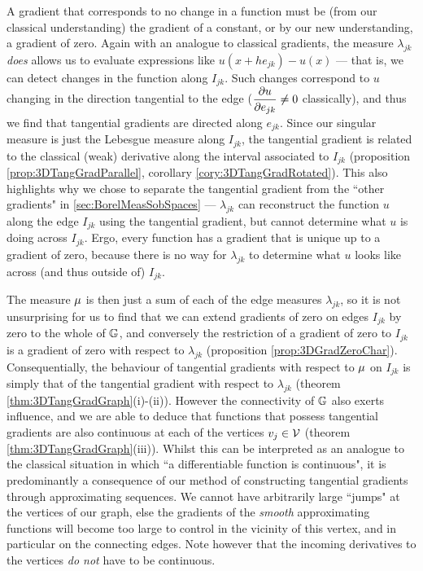 A gradient that corresponds to no change in a function must be (from our classical understanding) the gradient of a constant, or by our new understanding, a gradient of zero.
Again with an analogue to classical gradients, the measure $\lambda_{jk}$ \emph{does} allows us to evaluate expressions like $u(x+he_{jk})-u(x)$ --- that is, we can detect changes in the function along $I_{jk}$.
Such changes correspond to $u$ changing in the direction tangential to the edge ($\dfrac{\partial u}{\partial e_{jk}}\neq 0$ classically), and thus we find that tangential gradients are directed along $e_{jk}$.
Since our singular measure is just the Lebesgue measure along $I_{jk}$, the tangential gradient is related to the classical (weak) derivative along the interval associated to $I_{jk}$ (proposition \ref{prop:3DTangGradParallel}, corollary \ref{cory:3DTangGradRotated}).
This also highlights why we chose to separate the tangential gradient from the ``other gradients" in \ref{sec:BorelMeasSobSpaces} --- $\lambda_{jk}$ can reconstruct the function $u$ along the edge $I_{jk}$ using the tangential gradient, but cannot determine what $u$ is doing across $I_{jk}$.
Ergo, every function has a gradient that is unique up to a gradient of zero, because there is no way for $\lambda_{jk}$ to determine what $u$ looks like across (and thus outside of) $I_{jk}$.

The measure $\mu$ is then just a sum of each of the edge measures $\lambda_{jk}$, so it is not unsurprising for us to find that we can extend gradients of zero on edges $I_{jk}$ by zero to the whole of $\mathbb{G}$, and conversely the restriction of a gradient of zero to $I_{jk}$ is a gradient of zero with respect to $\lambda_{jk}$ (proposition \ref{prop:3DGradZeroChar}).
Consequentially, the behaviour of tangential gradients with respect to $\mu$ on $I_{jk}$ is simply that of the tangential gradient with respect to $\lambda_{jk}$ (theorem \ref{thm:3DTangGradGraph}(i)-(ii)).
However the connectivity of $\mathbb{G}$ also exerts influence, and we are able to deduce that functions that possess tangential gradients are also continuous at each of the vertices $v_j\in\mathcal{V}$ (theorem \ref{thm:3DTangGradGraph}(iii)).
Whilst this can be interpreted as an analogue to the classical situation in which ``a differentiable function is continuous", it is predominantly a consequence of our method of constructing tangential gradients through approximating sequences.
We cannot have arbitrarily large ``jumps" at the vertices of our graph, else the gradients of the \emph{smooth} approximating functions will become too large to control in the vicinity of this vertex, and in particular on the connecting edges.
Note however that the incoming derivatives to the vertices \emph{do not} have to be continuous.

